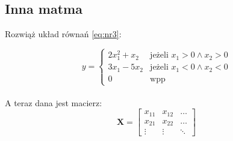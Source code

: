 \documentclass[12pt, a4paper]{article}
\begin{document}
\subsection{Inna matma}
\label{sec:InnaMatma}

Rozwiąż układ równań \eqref{eq:nr3}:

\begin{equation}
	y = \left\{	
	\begin{array}{ll}
	2x_1^2 + x_2 & \textrm{jeżeli $x_1 > 0 \land x_2 >0$} \\
	3x_1 - 5 x_2 & \textrm{jeżeli $x_1 < 0 \land x_2 <0$} \\
	0 & \textrm{wpp}
		
	\end{array} \right.
	\label{eq:nr3}
\end{equation}
\\
A teraz dana jest macierz:
\begin{displaymath}
\mathbf{X} =
\left[ \begin{array}{ccc}
x_{11} & x_{12} & \ldots \\
x_{21} & x_{22} & \ldots \\
\vdots & \vdots & \ddots
\end{array} \right]
\end{displaymath}

\newpage
\end{document}
